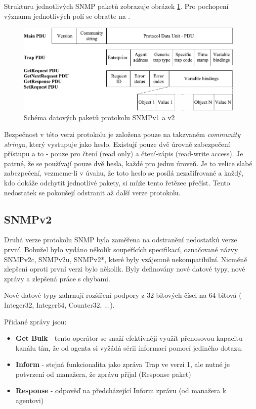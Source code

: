 Strukturu jednotlivých SNMP paketů zobrazuje obrázek \ref{obr_snmp3}. Pro pochopení významu jednotlivých polí se obraťte na \cite{RFC1157}.

\begin{figure}[htp]
	\begin{center}
		\includegraphics{obrazky/02_snmp_pdu.pdf}
		\caption{Schéma datových paketů protokolu SNMPv1 a v2}
		\label{obr_snmp3}
	\end{center}
\end{figure}

Bezpečnost v této verzi protokolu je založena pouze na takzvaném \textit{community string}u, který vystupuje jako heslo. Existují pouze dvě úrovně zabezpečení
přístupu a to - pouze pro čtení (read only) a čtení-zápis (read-write access). Je patrné, že se používají pouze dvě hesla, každé pro jednu úroveň. Je to velice slabé
zabezpečení, vezmeme-li v úvahu, že toto heslo se posílá nezašifrované a každý, kdo dokáže odchytit jednotlivé pakety, si může tento řetězec přečíst. Tento nedostatek
se pokoušejí odstranit až další verze protokolu.

\subsection*{SNMPv2}
Druhá verze protokolu SNMP byla zaměřena na odstranění nedostatků verze první. Bohužel bylo vydáno několik soupeřících specifikací, označované názvy SNMPv2c, SNMPv2u, SNMPv2*, které
byly vzájemně nekompatibilní. Nicméně zlepšení oproti první verzi bylo několik. Byly definovány nové datové typy, nové zprávy a zlepšená práce s chybami.

Nové datové typy zahrnují rozšíření podpory z 32-bitových čísel na 64-bitová ( Integer32, Integer64, Counter32, ...). 

Přidané zprávy jsou:
\begin{itemize}
	\item \textbf{Get Bulk} - tento operátor se snaží efektivněji využít přenosovou kapacitu kanálu tím, že od agenta si vyžádá sérii informací pomocí jediného dotazu.
	\item \textbf{Inform} - stejná funkcionalita jako zpráva Trap ve verzi 1, ale nutné je potvrzení od manažera, že zprávu přijal (Response paket)
	\item \textbf{Response} - odpověď na předcházející Inform zprávu (od manažera k agentovi)
\end{itemize}

